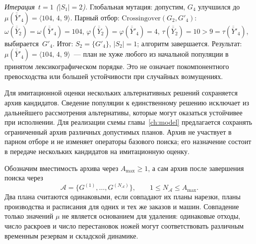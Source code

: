 \emph{Итерация~$t=1$ ($|S_1|=2$).}
Глобальная мутация: допустим, $G_4$ улучшился до~$\mu(\overline{\overline{Y}}'_4)=\langle 104,\,4,\,9\rangle$.
Парный отбор:
$\mathrm{Crossingover}(G_2,G'_4)$: $\omega(\overline{\overline{Y}}_2)=\omega(\overline{\overline{Y}}'_4)=104$, $\varphi(\overline{\overline{Y}}_2)=\varphi(\overline{\overline{Y}}'_4)=4$, $\tau(\overline{\overline{Y}}_2)=10>9=\tau(\overline{\overline{Y}}'_4)$, выбирается~$G'_4$.
Итог: $S_2=\{G'_4\}$, $|S_2|=1$; алгоритм завершается.
Результат: $\mu(\overline{\overline{Y}}'_4)=\langle 104,\,4,\,9\rangle$~--- план не хуже любого из начальной популяции в принятом лексикографическом порядке. Это не означает покомпонентного превосходства или большей устойчивости при случайных возмущениях.

Для имитационной оценки нескольких альтернативных решений сохраняется архив кандидатов.\label{sec:alg/candidate_archive}
Сведение популяции к единственному решению исключает из дальнейшего рассмотрения альтернативы, которые могут оказаться устойчивее при исполнении. Для реализации схемы главы~\ref{ch:model} предлагается сохранять ограниченный архив различных допустимых планов. Архив не участвует в парном отборе и не изменяет операторы базового поиска; его назначение состоит в передаче нескольких кандидатов на имитационную оценку.

Обозначим вместимость архива через $A_{\max}\geq1$, а сам архив после завершения поиска через
\[
  \mathcal A=\{G^{(1)},\ldots,G^{(N_{\mathcal A})}\},\qquad 1\leq N_{\mathcal A}\leq A_{\max}.
\]
Два плана считаются одинаковыми, если совпадают их планы нарезки, планы производства и расписания для одних и тех же заказов и машин. Совпадение только значений $\mu$ не является основанием для удаления: одинаковые отходы, число раскроев и число перестановок ножей могут соответствовать различным временным резервам и складской динамике.


